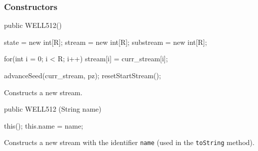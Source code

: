 \subsubsection* {Constructors}

\begin{code}
   public WELL512() \begin{hide} {
      state = new int[R];
      stream = new int[R];
      substream = new int[R];

      for(int i = 0; i < R; i++)
         stream[i] = curr_stream[i];

      advanceSeed(curr_stream, pz);
      resetStartStream();
   } \end{hide}
\end{code}
\begin{tabb} Constructs a new stream.
\end{tabb}
\begin{code}

   public WELL512 (String name) \begin{hide} {
      this();
      this.name = name;
   } \end{hide}
\end{code}
\begin{tabb} Constructs a new stream with the identifier \texttt{name}
  (used in the \texttt{toString} method).
\end{tabb}
\begin{htmlonly}
\end{htmlonly}

